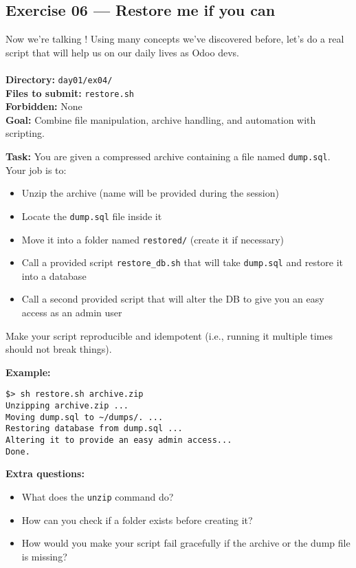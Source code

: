 \documentclass[12pt,a4paper]{article}
\begin{document}
\newpage
\subsection*{Exercise 06 — Restore me if you can}

Now we're talking ! Using many concepts we've discovered before, let's do a real script that will help us on our daily lives as Odoo devs.\\
\\
\textbf{Directory:} \texttt{day01/ex04/}\\
\textbf{Files to submit:} \texttt{restore.sh}\\
\textbf{Forbidden:} None\\
\textbf{Goal:} Combine file manipulation, archive handling, and automation with scripting.

\textbf{Task:} You are given a compressed archive containing a file named \texttt{dump.sql}. Your job is to:
\begin{itemize}
  \item Unzip the archive (name will be provided during the session)
  \item Locate the \texttt{dump.sql} file inside it
  \item Move it into a folder named \texttt{restored/} (create it if necessary)
  \item Call a provided script \texttt{restore\_db.sh} that will take \texttt{dump.sql} and restore it into a database
  \item Call a second provided script that will alter the DB to give you an easy access as an admin user
\end{itemize}
Make your script reproducible and idempotent (i.e., running it multiple times should not break things).

\textbf{Example:}
\begin{lstlisting}
$> sh restore.sh archive.zip
Unzipping archive.zip ...
Moving dump.sql to ~/dumps/. ...
Restoring database from dump.sql ...
Altering it to provide an easy admin access...
Done.
\end{lstlisting}

\textbf{Extra questions:}
\begin{itemize}
  \item What does the \texttt{unzip} command do?
  \item How can you check if a folder exists before creating it?
  \item How would you make your script fail gracefully if the archive or the dump file is missing?
\end{itemize}
\end{document}
